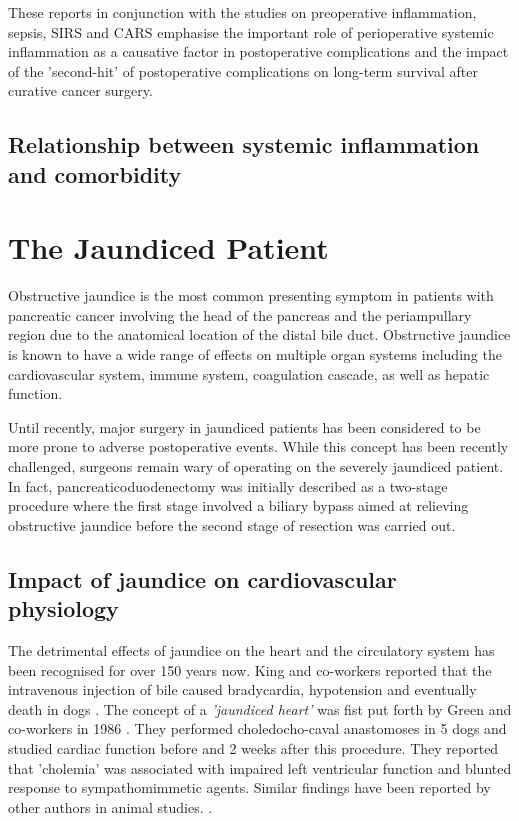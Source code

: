 These reports in conjunction with the studies on preoperative inflammation, sepsis, SIRS and CARS emphasise the important role of perioperative systemic inflammation as a causative factor in postoperative complications and the impact of the 'second-hit' of postoperative complications on long-term survival after curative cancer surgery.

\subsection{Relationship between systemic inflammation and comorbidity}

\section{The Jaundiced Patient}

Obstructive jaundice is the most common presenting symptom in patients with pancreatic cancer involving the head of the pancreas and the periampullary region due to the anatomical location of the distal bile duct. 
Obstructive jaundice is known to have a wide range of effects on multiple organ systems including the cardiovascular system, immune system, coagulation cascade, as well as hepatic function.

Until recently, major surgery in jaundiced patients has been considered to be more prone to adverse postoperative events. 
While this concept has been recently challenged, surgeons remain wary of operating on the severely jaundiced patient. 
In fact, pancreaticoduodenectomy was initially described as a two-stage procedure where the first stage involved a biliary bypass aimed at relieving obstructive jaundice before the second stage of resection was carried out.


\subsection{Impact of jaundice on cardiovascular physiology}

The detrimental effects of jaundice on the heart and the circulatory system has been recognised for over 150 years now. 
King and co-workers reported that the intravenous injection of bile caused bradycardia, hypotension and eventually death in dogs \parencite{king_effect_1909}. 
The concept of a \textit{'jaundiced heart'} was fist put forth by Green and co-workers in 1986 \parencite{green_jaundiced_1986}. 
They performed choledocho-caval anastomoses in 5 dogs and studied cardiac function before and 2 weeks after this procedure. 
They reported that 'cholemia' was associated with impaired left ventricular function and blunted response to sympathomimmetic agents. 
Similar findings have been reported by other authors in animal studies. \parencite{binah_obstructive_1985,bomzon_systemic_1986}. 

